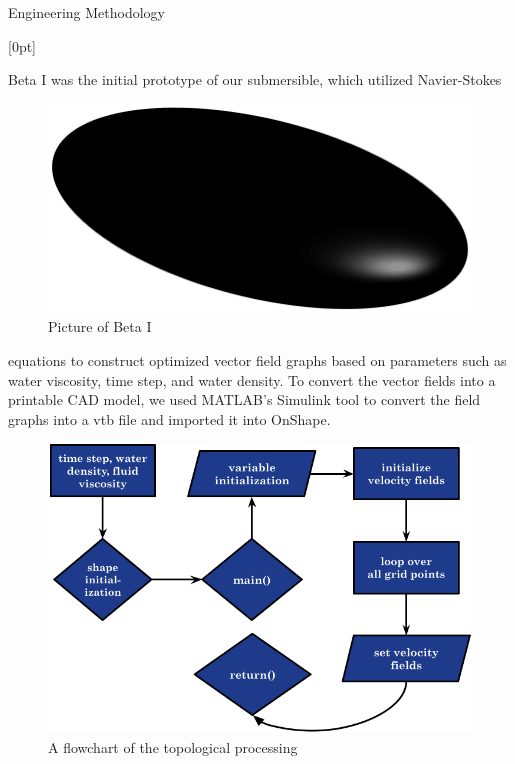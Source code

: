 \documentclass[final, 16pt]{beamer}
\newlength{\colwidth}
\newlength{\twocolwidth}
\begin{document}
\begin{frame}[t]
\begin{columns}[t]
\begin{column}{\twocolwidth}
\begin{block}{Engineering Methodology}
    \vspace*{1cm}

    [0pt]

    \begin{minipage}[t]{0.48\linewidth}

      Beta I was the initial prototype of our submersible, which utilized Navier-Stokes

       \begin{figure}
        \centering
        \vspace*{-0.5cm}
        \includegraphics[scale=0.35]{img/Topological_Model.png}
        \caption{Picture of Beta I}
        \label{fig:beta-i}
      \end{figure}

      equations to construct optimized vector field graphs based on parameters such as water viscosity, time step, and water density. To convert the vector fields into a printable CAD model, we used MATLAB's Simulink tool to convert the field graphs into a vtb file and imported it into OnShape.

      \begin{figure}[H]
        \centering
        \includegraphics[width=0.8\linewidth, height=0.50\linewidth]{img/Topological_Flow_Chart.png}
        \caption{A flowchart of the topological processing}
        \label{fig:topological-flow-chart}
      \end{figure}


\end{minipage}
\end{block}
\end{column}
\end{columns}
\end{frame}
\end{document}
